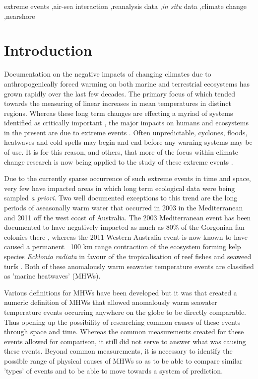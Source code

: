 \documentclass[a4paper,10pt,review]{elsarticle}
\begin{document}
\begin{frontmatter}
\begin{keyword}
extreme events \sep air-sea interaction \sep reanalysis data \sep \emph{in situ} data \sep climate change \sep nearshore
\end{keyword}

\end{frontmatter}

\linenumbers

\section{Introduction}
Documentation on the negative impacts of changing climates due to anthropogenically forced warming on both marine and terrestrial ecosystems has grown rapidly over the last few decades. The primary focus of which tended towards the measuring of linear increases in mean temperatures in distinct regions. Whereas these long term changes are effecting a myriad of systems identified as critically important \citep{IPCC2014}, the major impacts on humans and ecosystems in the present are due to extreme events \citep{Easterling2000}. Often unpredictable, cyclones, floods, heatwaves and cold-spells may begin and end before any warning systems may be of use. It is for this reason, and others, that more of the focus within climate change research is now being applied to the study of these extreme events \citep{Jentsch2007}.

Due to the currently sparse occurrence of such extreme events in time and space, very few have impacted areas in which long term ecological data were being sampled \emph{a priori}. Two well documented exceptions to this trend are the long periods of aseasonally warm water that occurred in 2003 in the Mediterranean and 2011 off the west coast of Australia. The 2003 Mediterranean event has been documented to have negatively impacted as much as 80\% of the Gorgonian fan colonies there \citep{Garrabou2009}, whereas the 2011 Western Australia event is now known to have caused a permanent ~100 km range contraction of the ecosystem forming kelp species \emph{Ecklonia radiata} in favour of the tropicalisation of reef fishes and seaweed turfs \citep{Wernberg2016}. Both of these anomalously warm seawater temperature events are classified as 'marine heatwaves' (MHWs).

Various definitions for MHWs have been developed but it was \citet{Hobday2016} that created a numeric definition of MHWs that allowed anomalously warm seawater temperature events occurring anywhere on the globe to be directly comparable. Thus opening up the possibility of researching common causes of these events through space and time. Whereas the common measurements created for these events allowed for comparison, it still did not serve to answer what was causing these events. Beyond common measurements, it is necessary to identify the possible range of physical causes of MHWs so as to be able to compare similar 'types' of events and to be able to move towards a system of prediction. 
\end{document}
